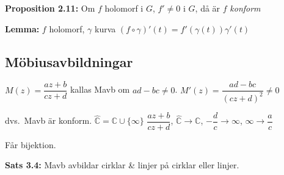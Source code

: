 \textbf{Proposition 2.11:} Om $f$ holomorf i $G$, $f' \neq 0$ i $G$, då är $f$ \emph{konform}

\textbf{Lemma:} $f$ holomorf, $\gamma$ kurva $(f \circ \gamma)'(t) = f'(\gamma(t))\gamma'(t)$

\subsection{Möbiusavbildningar}
$M(z) = \dfrac{az + b}{cz + d}$ kallas Mavb om $ad - bc \neq 0$. $M'(z) = \dfrac{ad - bc}{(cz + d)^2} \neq 0$

dvs.\ Mavb är konform. $\hat{\mathbb{C}} = \mathbb{C} \cup \{\infty\}$ \quad $\dfrac{az + b}{cz + d}$, $\hat{\mathbb{C}} \to \mathbb{C}$, $-\dfrac{d}{c} \to \infty$, $\infty \to \dfrac{a}{c}$

Får bijektion.

\textbf{Sats 3.4:} Mavb avbildar cirklar \& linjer på cirklar eller linjer.
